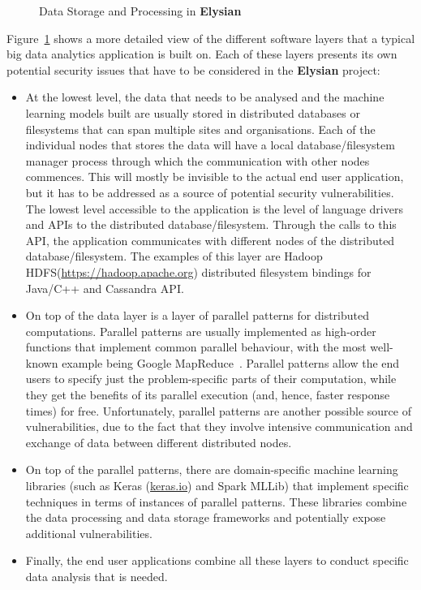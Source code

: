 \documentclass[a4paper,11pt]{article}
\newcommand{\project}[1]{\textbf{#1}\xspace}
\newcommand{\SECURITY}{\project{Elysian}}
\newcommand{\TheProject}{\SECURITY}
\begin{document}
\begin{figure}[tph!]
  \begin{center}
  \vspace{-19mm}
  \vspace{-2.3cm}
  \caption{Data Storage and Processing in \TheProject{}}
  \label{fig:storageprocessing}
  \end{center}
  \end{figure}

Figure~\ref{fig:storageprocessing} shows a more detailed view of the different software layers that a typical big data analytics application is built on. Each of these layers presents its own potential security issues that have to be considered in the \TheProject{} project: 
\begin{itemize}
\item At the lowest level, the data that needs to be analysed and the machine learning models built are usually stored in distributed databases or filesystems that can span multiple sites and organisations. Each of the individual nodes that stores the data will have a local database/filesystem manager process through which the communication with other nodes commences. This will mostly be invisible to the actual end user application, but it has to be addressed as a source of potential security vulnerabilities. The lowest level accessible to the application is the level of language drivers and APIs to the distributed database/filesystem. Through the calls to this API, the application communicates with different nodes of the distributed database/filesystem. The examples of this layer are Hadoop HDFS(\url{https://hadoop.apache.org}) distributed filesystem bindings for Java/C++ and Cassandra API. 
\item On top of the data layer is a layer of parallel patterns for distributed computations. Parallel patterns are usually implemented as high-order functions that implement common parallel behaviour, with the most well-known example being Google MapReduce~\cite{mapreduce}. Parallel patterns allow the end users to specify just the problem-specific parts of their computation, while they get the benefits of its parallel execution (and, hence, faster response times) for free. Unfortunately, parallel patterns are another possible source of vulnerabilities, due to the fact that they involve intensive communication and exchange of data between different distributed nodes. 
\item On top of the parallel patterns, there are domain-specific machine learning libraries (such as Keras (\url{keras.io}) and Spark MLLib) that implement specific %
techniques in terms of instances of parallel patterns. These libraries combine the data processing and data storage frameworks and potentially expose additional vulnerabilities. 
\item Finally, the end user applications combine all these layers to conduct specific data analysis that is needed. 
\end{itemize}
\end{document}
